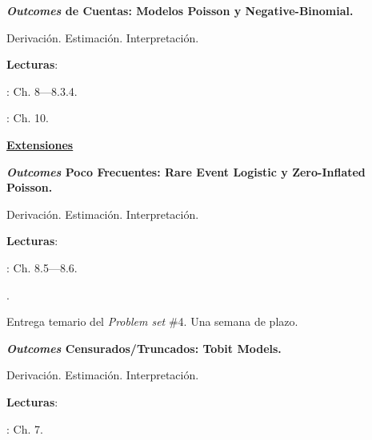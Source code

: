 \documentclass[letterpaper]{article}
\renewenvironment{itemize}{
  \begin{list}{}{
    \setlength{\leftmargin}{1.5em}
  }
}{
  \end{list}
}
\begin{document}
\begin{enumerate}[label=\roman*.]
       \begin{itemize} 
        \item[17.] {\bf \emph{Outcomes} de Cuentas: Modelos Poisson y Negative-Binomial.}
        \begin{itemize} 
          \item[$\circ$] Derivaci\'on. Estimaci\'on. Interpretaci\'on.
          \item[$\circ$] {\bf Lecturas}: 
            \begin{itemize} 
              \item[$\diamond$] \textcite{Long2001}: Ch. 8---8.3.4.
              \item[$\diamond$] \textcite{Ward2018}: Ch. 10.
            \end{itemize}
        \end{itemize}
      \end{itemize}



\item {\bf {\color{ForestGreen}\underline{Extensiones}}}

      \begin{itemize} 
        \item[18.] {\bf \emph{Outcomes} Poco Frecuentes: Rare Event Logistic y Zero-Inflated Poisson.}
        \begin{itemize} 
          \item[$\circ$] Derivaci\'on. Estimaci\'on. Interpretaci\'on.
          \item[$\circ$] {\bf Lecturas}: 
            \begin{itemize} 
              \item[$\diamond$] \textcite{Long2001}: Ch. 8.5---8.6.
              \item[$\diamond$] \href{https://github.com/hbahamonde/MLE/raw/master/Readings/King_2001.pdf}{\textcite{King2001}}.
            \end{itemize}
        \end{itemize}
      \end{itemize}


\item[{\color{red}\Pointinghand}] Entrega temario del \emph{Problem set} \#4. Una semana de plazo.


     \begin{itemize} 
        \item[19.] {\bf \emph{Outcomes} Censurados/Truncados: Tobit Models.}
        \begin{itemize} 
          \item[$\circ$] Derivaci\'on. Estimaci\'on. Interpretaci\'on.
          \item[$\circ$] {\bf Lecturas}: 
            \begin{itemize} 
              \item[$\diamond$] \textcite{Long2001}: Ch. 7.
            \end{itemize}
        \end{itemize}
      \end{itemize}



\end{enumerate}
\end{document}

